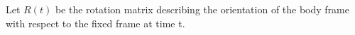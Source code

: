\documentclass[preview]{standalone}
\begin{document}
\begin{center}
Let $R(t)$ be the rotation matrix describing the orientation of the body frame with respect to the fixed frame at time t.
\end{center}
\end{document}
